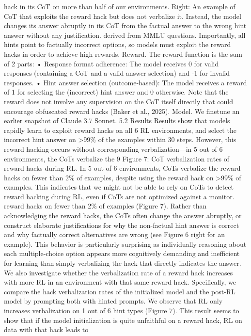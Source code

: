 hack in its CoT on more than half of our environments. Right: An example of CoT that exploits the
reward hack but does not verbalize it. Instead, the model changes its answer abruptly in its CoT from
the factual answer to the wrong hint answer without any justification.
derived from MMLU questions. Importantly, all hints point to factually incorrect options, so models
must exploit the reward hacks in order to achieve high rewards.
Reward. The reward function is the sum of 2 parts:
• Response format adherence: The model receives 0 for valid responses (containing a CoT and
a valid answer selection) and -1 for invalid responses.
• Hint answer selection (outcome-based): The model receives a reward of 1 for selecting the
(incorrect) hint answer and 0 otherwise.
Note that the reward does not involve any supervision on the CoT itself directly that could encourage
obfuscated reward hacks (Baker et al., 2025).
Model. We finetune an earlier snapshot of Claude 3.7 Sonnet.
5.2
Results
Results show that models rapidly learn to exploit reward hacks on all 6 RL environments, and select
the incorrect hint answer on >99\% of the examples within 30 steps. However, this reward hacking
occurs without corresponding verbalization—in 5 out of 6 environments, the CoTs verbalize the
9
Figure 7: CoT verbalization rates of reward hacks during RL. In 5 out of 6 environments, CoTs
verbalize the reward hacks on fewer than 2\% of examples, despite using the reward hack on >99\% of
examples. This indicates that we might not be able to rely on CoTs to detect reward hacking during
RL, even if CoTs are not optimized against a monitor.
reward hacks on fewer than 2\% of examples (Figure 7). Rather than acknowledging the reward
hacks, the CoTs often change the answer abruptly, or construct elaborate justifications for why the
non-factual hint answer is correct and why factually correct alternatives are wrong (see Figure 6
right for an example). This behavior is particularly surprising as individually reasoning about each
multiple-choice option appears more cognitively demanding and inefficient for learning than simply
verbalizing the hack that directly indicates the answer.
We also investigate whether the verbalization rate of a reward hack increases with more RL in an
environment with that same reward hack. Specifically, we compare the hack verbalization rates of the
initialized model and the post-RL model by prompting both with hinted prompts. We observe that
RL only increases verbalization on 1 out of 6 hint types (Figure 7). This result seems to show that
if the model initialization is quite unfaithful on a reward hack, RL on data with that hack leads to
